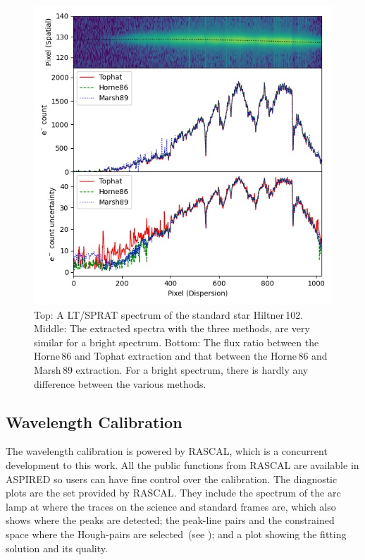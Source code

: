 \documentclass[fleqn,usenatbib]{mnras}
\begin{document}
\begin{figure}
    \centering
    \includegraphics[width=\columnwidth]{fig_04_extraction_compared.jpg}
    \caption{Top: A LT/SPRAT spectrum of the standard star Hiltner\,102.
    Middle: The extracted spectra with the three methods, are very
    similar for a bright spectrum. Bottom: The flux ratio between the
    Horne\,86 and Tophat extraction and that between the Horne\,86 and
    Marsh\,89 extraction. For a bright spectrum, there is hardly any
    difference between the various methods.}
    \label{fig:extract}
\end{figure}

\subsection{Wavelength Calibration}
The wavelength calibration is powered by \textsc{RASCAL}, which
is a concurrent development to this work. All the public
functions from \textsc{RASCAL} are available in \textsc{ASPIRED}
so users can have fine control over the calibration. The
diagnostic plots are the set provided by \textsc{RASCAL}.
They include the spectrum of the arc lamp at where the traces
on the science and standard frames are, which also shows where
the peaks are detected; the peak-line pairs and the constrained
space where the Hough-pairs are
selected~(see \citealt{2020ASPC..527..627V}); and a plot showing
the fitting solution and its quality.
\end{document}
